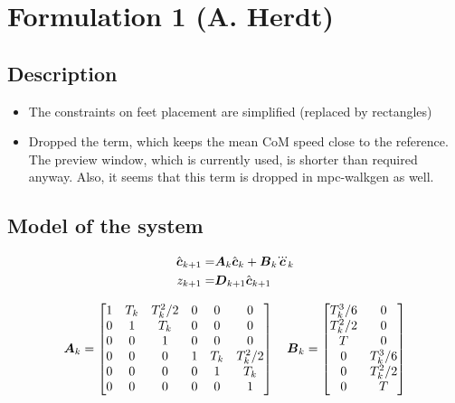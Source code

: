 \section{Formulation 1 (A. Herdt)}\label{sec.form01}


\subsection{Description}
\begin{itemize}
    \item The constraints on feet placement are simplified (replaced by rectangles)
    \item Dropped the term, which keeps the mean CoM speed close to the reference. The preview window,
    which is currently used, is shorter than required anyway. Also, it seems that this term is dropped
    in mpc-walkgen as well.
\end{itemize}


\subsection{Model of the system}
\begin{align*}
\cstate_{k+1} =& \M{A}_k \cstate_k + \M{B}_k \cjerk_k\\
z_{k+1} =& \M{D}_{k+1} \cstate_{k+1}
\end{align*}

\begin{equation*}
\mbox{\boldmath $A$}_k = 
\begin{bmatrix}
    1       & T_k   & T_k^2/2   & 0 & 0 & 0\\
    0       & 1     & T_k       & 0 & 0 & 0\\
    0       & 0     & 1         & 0 & 0 & 0\\
    0 & 0 & 0                   & 1       & T_k   & T_k^2/2   \\
    0 & 0 & 0                   & 0       & 1     & T_k       \\
    0 & 0 & 0                   & 0       & 0     & 1         \\
\end{bmatrix}
\quad
\mbox{\boldmath $B$}_k =
\begin{bmatrix}
    T_k^3/6 & 0\\
    T_k^2/2 & 0\\
    T       & 0\\
    0       & T_k^3/6 \\
    0       & T_k^2/2 \\
    0       & T       \\
\end{bmatrix}
\end{equation*}

